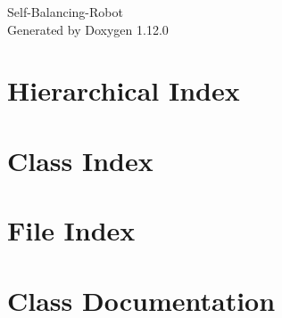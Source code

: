 \documentclass[twoside]{book}
\newcommand{\+}{\discretionary{\mbox{\scriptsize$\hookleftarrow$}}{}{}}
\newcommand{\clearemptydoublepage}{%
    \newpage{\pagestyle{empty}\cleardoublepage}%
  }
\begin{document}
  \raggedbottom
    \hypersetup{pageanchor=false,
                bookmarksnumbered=true,
                pdfencoding=unicode
               }
  \begin{titlepage}
  \vspace*{7cm}
  \begin{center}%
  {\Large Self-\/\+Balancing-\/\+Robot}\\
  \vspace*{1cm}
  {\large Generated by Doxygen 1.12.0}\\
  \end{center}
  \end{titlepage}
  \clearemptydoublepage
  \tableofcontents
  \clearemptydoublepage
  \hypersetup{pageanchor=true}





\chapter{Hierarchical Index}

\chapter{Class Index}

\chapter{File Index}

\chapter{Class Documentation}





















\end{document}
